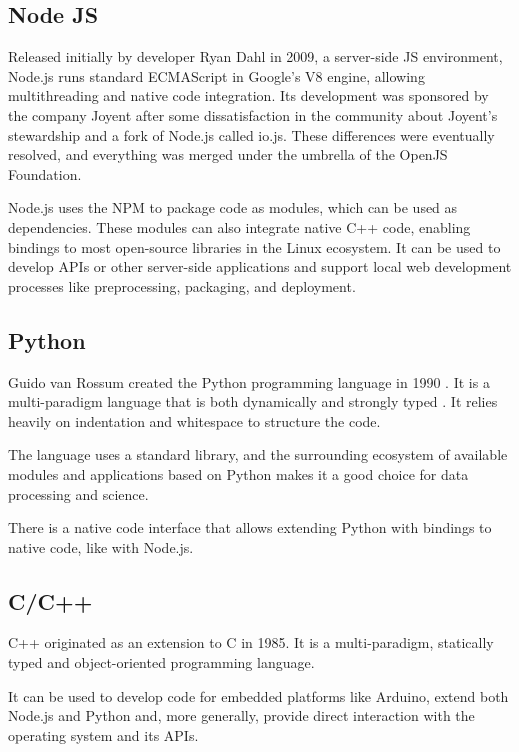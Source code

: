 \subsection{Node JS}

Released initially by developer Ryan Dahl in 2009, a server-side \ac{JS} environment, Node.js runs standard ECMAScript in Google's V8 engine, allowing multithreading and native code integration. Its development was sponsored by the company Joyent after some dissatisfaction in the community about Joyent's stewardship and a fork of Node.js called io.js. These differences were eventually resolved, and everything was merged under the umbrella of the OpenJS Foundation. 

Node.js uses the \ac{NPM} to package code as modules, which can be used as dependencies. These modules can also integrate native C++ code, enabling bindings to most open-source libraries in the Linux ecosystem. It can be used to develop \ac{API}s or other server-side applications and support local web development processes like preprocessing, packaging, and deployment. 

\subsection{Python}

Guido van Rossum created the Python programming language in 1990 \parencite{pythonHistory}. It is a multi-paradigm language that is both dynamically and strongly typed \parencite{pythonTyping}. It relies heavily on indentation and whitespace to structure the code.

The language uses a standard library, and the surrounding ecosystem of available modules and applications based on Python makes it a good choice for data processing and science.

There is a native code interface that allows extending Python with bindings to native code, like with Node.js.

\subsection{C/C++}

C++ originated as an extension to C in 1985. It is a multi-paradigm, statically typed and object-oriented programming language.

It can be used to develop code for embedded platforms like Arduino, extend both Node.js and Python and, more generally, provide direct interaction with the operating system and its APIs.


